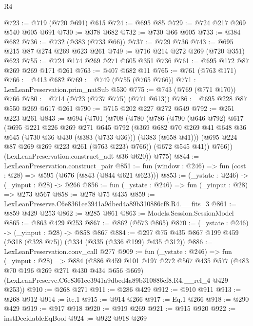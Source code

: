 \begin{lexlean}{R4}
\begin{coremodule}
@723 := @719 (@720 @691) @615
@724 := @695 @85
@729 := @724 @217 @269 @540 @605 @691
@730 := @378 @682
@732 := @730 @66 @605
@733 := @384 @682
@736 := @732 (@383 (@733 @66))
@737 := @729 @736
@743 := @695 @215 @87 @274 @269 @623 @261
@749 := @716 @214 @272 @269 (@720 @351) @623
@755 := @724 @174 @269 @271 @605 @351 @736
@761 := @695 @172 @87 @269 @269 @171 @261
@763 := @407 @682 @11
@765 := @761 (@763 @171)
@766 := @413 @682
@769 := @749 (@755 (@765 @766))
@771 := LexLeanPreservation.prim_natSub @530
@775 := @743 (@769 (@771 @170)) @766
@780 := @714 (@723 (@737 @775) (@771 @613))
@786 := @695 @228 @87 @550 @269 @617 @261
@790 := @715 @202 @227 @272 @549
@792 := @251 @223 @261
@843 := @694
    (@701
      (@708
        (@780
          (@786
            (@790
              (@646 @792)
              @617
              (@695
                @221
                @226
                @269
                @271
                @645
                @792
                (@369
                  @682
                  @70
                  @269
                  @41
                  @648
                  @36
                  @645
                  (@730 @36 @430 (@383 (@733 @36)))
                  (@383 (@658 @41)))
                (@695 @224 @87 @269 @269 @223 @261 (@763 @223) @766))
              (@672 @545 @41))
            @766))
        (LexLeanPreservation.construct_adt @36 @620))
      @775)
@844 := LexLeanPreservation.construct_pair
@851 := fun (window : @246) => fun (cost : @28) => @595 (@676 (@843 (@844 @621 @623)))
@853 := (_ystate : @246) -> (_yinput : @28) -> @266
@856 := fun (_ystate : @246) => fun (_yinput : @28) => @273 @567
@858 := @278 @75 @435
@859 := LexLeanPreserve.C6e8361ce3941a9dbed4a89b310886cf8.R4.__fits_3
@861 := @859 @429 @253
@862 := @285 @861
@863 := Models.Session.SessionModel
@865 := @863 @429 @253
@867 := @862 (@573 @865)
@870 := (_ystate : @246) -> (_yinput : @28) -> @858 @867
@884 := @297 @75 @435 @867 @199 @459 (@318 (@328 @75)) (@334 (@335 (@336 @199) @435 @312))
@886 := LexLeanPreservation.conv_call @277
@909 := fun (_ystate : @246) =>
  fun (_yinput : @28) =>
  @884
    (@886
      @459
      @101
      @197
      @272
      @567
      @435
      @577
      (@483 @70 @196 @269 @271 @430 @434 @656 @669)
      (LexLeanPreserve.C6e8361ce3941a9dbed4a89b310886cf8.R4.__rel_4 @429 @253))
@910 := @268 @271
@911 := @286 @429
@912 := @910 @911
@913 := @268 @912
@914 := ite.{1}
@915 := @914 @266
@917 := Eq.{1} @266
@918 := @290 @429
@919 := @917 @918
@920 := @919 @269
@921 := @915 @920
@922 := instDecidableEqBool
@924 := @922 @918 @269

\end{coremodule}
\end{lexlean}
